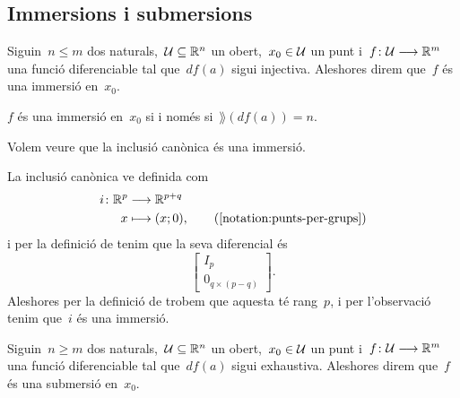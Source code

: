 \documentclass[../../main.tex]{subfiles}
\begin{document}
    \subsection{Immersions i submersions}
    \begin{definition}[Immersió]
        \label{def:immersio}
        Siguin~\(n\leq m\) dos naturals,~\(\mathcal{U}\subseteq\mathbb{R}^{n}\) un obert,~\(x_{0}\in\mathcal{U}\) un punt i~\(f\colon\mathcal{U}\longrightarrow\mathbb{R}^{m}\) una funció diferenciable tal que~\(df(a)\) sigui injectiva.
        Aleshores direm que~\(f\) és una immersió en~\(x_{0}\).
    \end{definition}
    \begin{observation} %
        \label{obs:immersio-si-i-nomes-si-te-rang-maximal}
        \(f\) és una immersió en~\(x_{0}\) si i només si~\(\rang(df(a))=n\).
    \end{observation}
    \begin{example}
        \label{ex:la-inclusio-canonica-es-una-immersio}
        Volem veure que la inclusió canònica és una immersió.
    \end{example}
    \begin{solution}
        La inclusió canònica ve definida com
        \begin{align*}
            i\colon\mathbb{R}^{p}&\longrightarrow\mathbb{R}^{p+q} \\
            x&\longmapsto(x;0), \tag{\ref{notation:punts-per-grups}}
        \end{align*}
        i per la definició de  tenim que la seva diferencial és
        \[\left[\begin{array}{c}
            I_{p} \\\hline
            0_{q\times(p-q)}
        \end{array}\right].\]
        Aleshores per la definició de  trobem que aquesta té rang~\(p\), i per l'observació  tenim que~\(i\) és una immersió.
    \end{solution}
    \begin{definition}[Submersió]
        \label{def:submersio}
        Siguin~\(n\geq m\) dos naturals,~\(\mathcal{U}\subseteq\mathbb{R}^{n}\) un obert,~\(x_{0}\in\mathcal{U}\) un punt i~\(f\colon\mathcal{U}\longrightarrow\mathbb{R}^{m}\) una funció diferenciable tal que~\(df(a)\) sigui exhaustiva.
        Aleshores direm que~\(f\) és una submersió en~\(x_{0}\).
    \end{definition}
\end{document}
